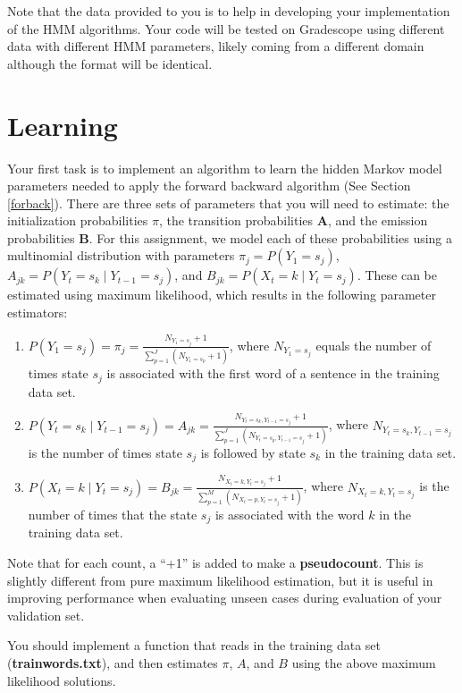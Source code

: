 \documentclass[11pt,addpoints,answers]{exam}
\begin{document}
Note that the data provided to you is to help in developing your implementation of the HMM algorithms. Your code will be tested on Gradescope using different data with different HMM parameters, likely coming from a different domain although the format will be identical.

\section{Learning}\label{learn}
Your first task is to implement an algorithm to learn the hidden Markov model parameters needed to apply the forward backward algorithm (See Section \ref{forback}). There are three sets of parameters that you will need to estimate: the initialization probabilities {\boldmath$\pi$}, the transition probabilities $\mathbf A$, and the emission probabilities $\mathbf B$. For this assignment, we model each of these probabilities using a multinomial distribution with parameters $ \pi_j=P(Y_1=s_j)$, $ A_{jk} = P(Y_{t}=s_k\mid Y_{t-1}=s_j)$, and $ B_{jk} = P(X_t=k\mid Y_{t}=s_j)$. These can be estimated using maximum likelihood, which results in the following parameter estimators:

\begin{enumerate}
    \item $P(Y_1 = s_j) = \pi_j = \frac{N_{Y_1=s_j}+1}{\sum_{p=1}^{J}(N_{Y_1=s_p}+1)}$, where $N_{Y_1=s_j}$ equals the number of times state $s_j$ is associated with the first word of a sentence in the training data set.
    \item $P(Y_{t} = s_k\mid Y_{t-1}=s_j) = A_{jk}= \frac{N_{Y_t=s_k,Y_{t-1}=s_j}+1}{\sum_{p=1}^J (N_{Y_t=s_p,Y_{t-1}=s_j}+1)}$, where $N_{Y_t=s_k,Y_{t-1}=s_j}$ is the number of times state $s_j$ is followed by state $s_k$ in the training data set.  
    \item $P(X_{t} = k\mid Y_{t}=s_j) = B_{jk}= \frac{N_{X_t=k,Y_t=s_j}+1}{\sum_{p=1}^M (N_{X_t=p,Y_t=s_j}+1)}$, where $N_{X_t=k,Y_t=s_j}$ is the number of times that the state $s_j$ is associated with the word $k$ in the training data set.
\end{enumerate}

Note that for each count, a ``+1'' is added to make a \textbf{pseudocount}. This is slightly different from pure maximum likelihood estimation, but it is useful in improving performance when evaluating unseen cases during evaluation of your validation set.

You should implement a function that reads in the training data set (\textbf{trainwords.txt}), and then estimates $\pi$, $A$, and $B$ using the above maximum likelihood solutions. 
\end{document}
